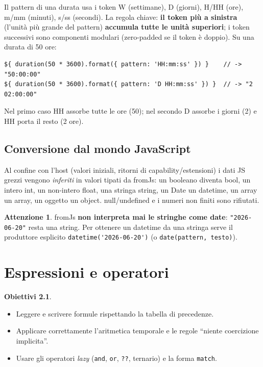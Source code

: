 \documentclass[11pt,a4paper]{book}
\let\code\lstinline
\newcommand{\ic}[1]{{\ttfamily #1}}
\theoremstyle{definition}
\newtheorem*{obiettivi}{Obiettivi}
\newtheorem*{attenzione}{Attenzione}
\begin{document}
{{{{Il \ic{pattern} di una durata usa i token \ic{W} (settimane), \ic{D} (giorni),
\ic{H}/\ic{HH} (ore), \ic{m}/\ic{mm} (minuti), \ic{s}/\ic{ss} (secondi). La regola
chiave: \textbf{il token più a sinistra} (l'unità più grande del pattern)
\textbf{accumula tutte le unità superiori}; i token successivi sono componenti
modulari (zero-padded se il token è doppio). Su una durata di 50 ore:

\begin{lstlisting}
${ duration(50 * 3600).format({ pattern: 'HH:mm:ss' }) }    // -> "50:00:00"
${ duration(50 * 3600).format({ pattern: 'D HH:mm:ss' }) }  // -> "2 02:00:00"
\end{lstlisting}

Nel primo caso \ic{HH} assorbe tutte le ore (50); nel secondo \ic{D} assorbe i
giorni (2) e \ic{HH} porta il resto (2 ore).

\section{Conversione dal mondo JavaScript}

Al confine con l'host (valori iniziali, ritorni di capability/estensioni) i dati
JS grezzi vengono \emph{inferiti} in valori tipati da \ic{fromJs}: un booleano
diventa \ic{bool}, un intero \ic{int}, un non-intero \ic{float}, una stringa
\ic{string}, un \ic{Date} un \ic{datetime}, un array un \ic{array}, un oggetto un
\ic{object}. \ic{null}/\ic{undefined} e i numeri non finiti sono rifiutati.

\begin{attenzione}
\ic{fromJs} \textbf{non interpreta mai le stringhe come date}: \code|"2026-06-20"|
resta una \ic{string}. Per ottenere un \ic{datetime} da una stringa serve il
produttore esplicito \code|datetime('2026-06-20')| (o \code|date(pattern, testo)|).
\end{attenzione}

\chapter{Espressioni e operatori}
\label{ch:espressioni}

\begin{obiettivi}
\begin{itemize}
  \item Leggere e scrivere formule rispettando la tabella di precedenze.
  \item Applicare correttamente l'aritmetica temporale e le regole ``niente
    coercizione implicita''.
  \item Usare gli operatori \emph{lazy} (\code|and|, \code|or|, \code|??|,
    ternario) e la forma \code|match|.
\end{itemize}
\end{obiettivi}

}}}}
\end{document}
